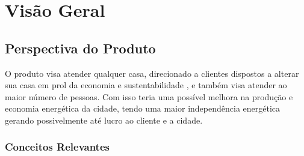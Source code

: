 \chapter{Visão Geral}
    \section{Perspectiva do Produto}
        \par O produto visa atender qualquer casa, direcionado a clientes dispostos a alterar sua casa em prol da economia e sustentabilidade , e também visa atender ao maior número de pessoas. Com isso teria uma  possível melhora na produção e economia energética da cidade, tendo uma maior independência energética gerando possivelmente até lucro ao cliente e a cidade.

        \subsection{Conceitos Relevantes}
